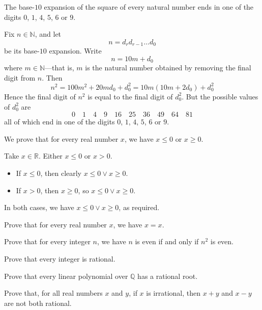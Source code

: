 \begin{proposition}
The base-$10$ expansion of the square of every natural number ends in one of the digits $0$, $1$, $4$, $5$, $6$ or $9$.
\end{proposition}

\begin{cproof}
Fix $n \in \mathbb{N}$, and let
\[n=d_rd_{r-1} \dots d_0\]
be its base-$10$ expansion. Write
\[n=10m+d_0\]
where $m \in \mathbb{N}$---that is, $m$ is the natural number obtained by removing the final digit from $n$. Then
\[n^2=100m^2+20md_0+d_0^2 = 10m(10m+2d_0)+d_0^2\]
Hence the final digit of $n^2$ is equal to the final digit of $d_0^2$. But the possible values of $d_0^2$ are
\[0 \quad 1 \quad 4 \quad 9 \quad 16 \quad 25 \quad 36 \quad 49 \quad 64 \quad 81\]
all of which end in one of the digits $0$, $1$, $4$, $5$, $6$ or $9$.
\end{cproof}

\begin{example}
We prove that for every real number $x$, we have $x \le 0$ or $x \ge 0$.

Take $x \in \mathbb{R}$. Either $x \le 0$ or $x > 0$. 
\begin{itemize}
\item If $x \le 0$, then clearly $x \le 0 \vee x \ge 0$.
\item If $x > 0$, then $x \ge 0$, so $x \le 0 \vee x \ge 0$.
\end{itemize}
In both cases, we have $x \le 0 \vee x \ge 0$, as required.
\end{example}

\begin{exercise}
Prove that for every real number $x$, we have $x = x$.
\end{exercise}

\begin{exercise}
  Prove that for every integer $n$, we have $n$ is even if and only if $n^2$ is even.
\end{exercise}

\begin{exercise}
\label{exEveryIntegerIsRational}
Prove that every integer is rational.
\end{exercise}

\begin{exercise}
Prove that every linear polynomial over $\mathbb{Q}$ has a rational root.
\end{exercise}


\begin{exercise}
Prove that, for all real numbers $x$ and $y$, if $x$ is irrational, then $x+y$ and $x-y$ are not both rational.
\end{exercise}

